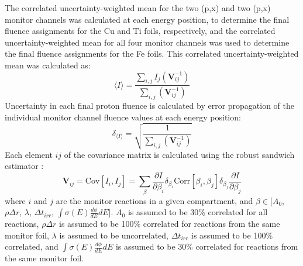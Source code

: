 % 
The correlated uncertainty-weighted mean  for the two (p,x) and two (p,x) monitor channels was calculated at each energy position, to determine the final fluence assignments for the Cu and Ti foils, respectively, and the correlated uncertainty-weighted mean  for all four monitor channels was used to determine the final fluence assignments for the Fe foils.
This correlated uncertainty-weighted mean was calculated as:
\begin{equation} \label{eq:weighted_average_beamcurrent}
    \langle I \rangle  = \frac{ \sum_{i,j} I_j  \left( \mathbf{V}^{-1}_{ij}  \right) }{\sum_{i,j}  \left( \mathbf{V}^{-1}_{ij}  \right)} 
\end{equation}
Uncertainty in each final proton fluence  is  calculated by error propagation of the individual monitor channel fluence values  at each energy position:
\begin{equation}
    \label{eq:corrWeight}
    \delta_{\langle I \rangle} = \sqrt{\frac{ 1}{\sum_{i,j}  \left( \mathbf{V}^{-1}_{ij}  \right)}} 
\end{equation}
Each element $ij$ of the covariance matrix is calculated using the robust
sandwich estimator  \cite{huber1967behavior}:
\begin{equation}
    \label{eq:Vij}
    \mathbf{V}_{ij} = \mathrm{Cov}[I_i, I_j] = \sum_{\beta} \frac{\partial I}{\partial \beta_i} \delta_{\beta_i} \mathrm{Corr}[\beta_i, \beta_j] \delta_{\beta_j} \frac{\partial I}{\partial \beta_j}
\end{equation}
where $i$ and $j$ are the monitor reactions in a given compartment, and $\beta \in [A_0$, $\rho \Delta r$, $\lambda$, $\Delta t_{irr}$, $\int \sigma(E) \frac{d\phi}{dE}dE$]. 
$A_0$ is assumed to be 30\% correlated for all reactions, $\rho \Delta r$ is assumed to be 100\% correlated for reactions from the same monitor foil, $\lambda$ is assumed to be uncorrelated, $\Delta t_{irr}$ is assumed to be 100\% correlated, and $\int \sigma(E) \frac{d\phi}{dE}dE$ is assumed to be 30\% correlated for reactions from the same monitor foil.  

